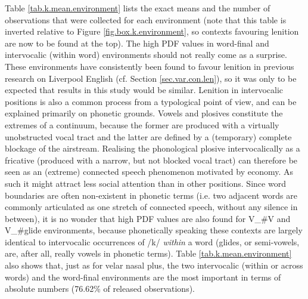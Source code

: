 Table \ref{tab.k.mean.environment} lists the exact means and the number of observations that were collected for each environment (note that this table is inverted relative to Figure \ref{fig.box.k.environment}, so contexts favouring lenition are now to be found at the top).
The high PDF values in word-final and intervocalic (within word) environments should not really come as a surprise.
These environments have consistently been found to favour lenition in previous research on Liverpool English (cf. Section \ref{sec.var.con.len}), so it was only to be expected that results in this study would be similar.
Lenition in intervocalic positions is also a common process from a typological point of view, and can be explained primarily on phonetic grounds. 
Vowels and plosives constitute the extremes of a continuum, because the former are produced with a virtually unobstructed vocal tract and the latter are defined by a (temporary) complete blockage of the airstream.
Realising the phonological plosive intervocalically as a fricative (produced with a narrow, but not blocked vocal tract) can therefore be seen as an (extreme) connected speech phenomenon motivated by economy.
As such it might attract less social attention than in other positions.
Since word boundaries are often non-existent in phonetic terms (i.e. two adjacent words are commonly articulated as one stretch of connected speech, without any silence in between), it is no wonder that high PDF values are also found for V\_\#V and V\_\#glide environments, because phonetically speaking these contexts are largely identical to intervocalic occurrences of /k/ \emph{within} a word (glides, or semi-vowels, are, after all, really vowels in phonetic terms).
Table \ref{tab.k.mean.environment} also shows that, just as for velar nasal plus, the two intervocalic (within or across words) and the word-final environments are the most important in terms of absolute numbers (76.62\% of released observations).

